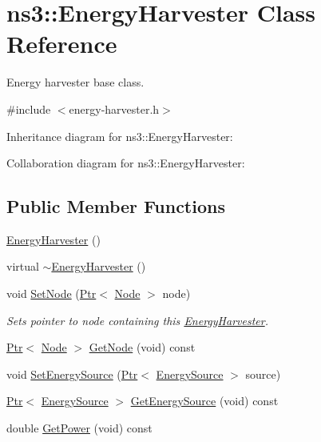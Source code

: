 \hypertarget{classns3_1_1EnergyHarvester}{}\section{ns3\+:\+:Energy\+Harvester Class Reference}
\label{classns3_1_1EnergyHarvester}


Energy harvester base class.  




{\ttfamily \#include $<$energy-\/harvester.\+h$>$}



Inheritance diagram for ns3\+:\+:Energy\+Harvester\+:


Collaboration diagram for ns3\+:\+:Energy\+Harvester\+:
\subsection*{Public Member Functions}
\begin{DoxyCompactItemize}
\item 
\hyperlink{classns3_1_1EnergyHarvester_ab6520ad23083bc96b7ca4136b33ea688}{Energy\+Harvester} ()
\item 
virtual \hyperlink{classns3_1_1EnergyHarvester_a8a141158142a4a080c51f4b273baa2d9}{$\sim$\+Energy\+Harvester} ()
\item 
void \hyperlink{classns3_1_1EnergyHarvester_ad479141b1019ee683615272e807e529c}{Set\+Node} (\hyperlink{classns3_1_1Ptr}{Ptr}$<$ \hyperlink{classns3_1_1Node}{Node} $>$ node)
\begin{DoxyCompactList}\small\item\em Sets pointer to node containing this \hyperlink{classns3_1_1EnergyHarvester}{Energy\+Harvester}. \end{DoxyCompactList}\item 
\hyperlink{classns3_1_1Ptr}{Ptr}$<$ \hyperlink{classns3_1_1Node}{Node} $>$ \hyperlink{classns3_1_1EnergyHarvester_a4ebe893a0fbb66d56ae8049155bb0e88}{Get\+Node} (void) const 
\item 
void \hyperlink{classns3_1_1EnergyHarvester_ad659bea785a5d3de63f2d9c767e809ab}{Set\+Energy\+Source} (\hyperlink{classns3_1_1Ptr}{Ptr}$<$ \hyperlink{classns3_1_1EnergySource}{Energy\+Source} $>$ source)
\item 
\hyperlink{classns3_1_1Ptr}{Ptr}$<$ \hyperlink{classns3_1_1EnergySource}{Energy\+Source} $>$ \hyperlink{classns3_1_1EnergyHarvester_a95d3d3f4d83d3bb33268f0abfd166f58}{Get\+Energy\+Source} (void) const 
\item 
double \hyperlink{classns3_1_1EnergyHarvester_a4f4aed7ac81b2e655fcb71980b299c84}{Get\+Power} (void) const 
\end{DoxyCompactItemize}
